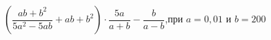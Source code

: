 \begin{ex}[type=simplify_calculate]
	\begin{condition}
		\(\left( \dfrac{ab+b^2}{5a^2-5ab}+ab+b^2 \right)\cdot\dfrac{5a}{a+b}-\dfrac{b}{a-b}\),\quad при \( a=0,01 \) и \( b=200 \)
	\end{condition}
\end{ex}
